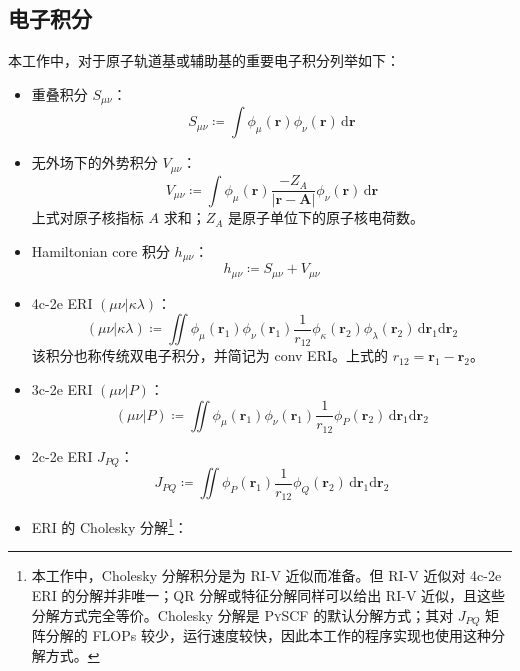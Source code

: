 \subsection{电子积分}

本工作中，对于原子轨道基或辅助基的重要电子积分列举如下：
\begin{itemize}[nosep]
\item 重叠积分 $S_{\mu \nu}$：
\begin{equation}
    S_{\mu \nu} \coloneq \int \phi_\mu (\bm{r}) \phi_\nu (\bm{r}) \, \mathrm{d} \bm{r}
\end{equation}
\item 无外场下的外势积分 $V_{\mu \nu}$：
\begin{equation}
    V_{\mu \nu} \coloneq \int \phi_\mu (\bm{r}) \frac{- Z_A}{|\bm{r} - \bm{A}|} \phi_\nu (\bm{r}) \, \mathrm{d} \bm{r}
\end{equation}
上式对原子核指标 $A$ 求和；$Z_A$ 是原子单位下的原子核电荷数。
\item Hamiltonian core 积分 $h_{\mu \nu}$：
\begin{equation}
    h_{\mu \nu} \coloneq S_{\mu \nu} + V_{\mu \nu}
\end{equation}
\item 4c-2e ERI $(\mu \nu | \kappa \lambda)$：
\begin{equation}
    (\mu \nu | \kappa \lambda) \coloneq \iint \phi_\mu (\bm{r}_1) \phi_\nu (\bm{r}_1) \frac{1}{r_{12}} \phi_\kappa (\bm{r}_2) \phi_\lambda (\bm{r}_2) \, \mathrm{d} \bm{r}_1 \mathrm{d} \bm{r}_2
\end{equation}
该积分也称传统双电子积分，并简记为 conv ERI。上式的 $r_{12} = \bm{r}_1 - \bm{r}_2$。
\item 3c-2e ERI $(\mu \nu | P)$：
\begin{equation}
    (\mu \nu | P) \coloneq \iint \phi_\mu (\bm{r}_1) \phi_\nu (\bm{r}_1) \frac{1}{r_{12}} \phi_P (\bm{r}_2) \, \mathrm{d} \bm{r}_1 \mathrm{d} \bm{r}_2
\end{equation}
\item 2c-2e ERI $J_{PQ}$：
\begin{equation}
    J_{PQ} \coloneq \iint \phi_P (\bm{r}_1) \frac{1}{r_{12}} \phi_Q (\bm{r}_2) \, \mathrm{d} \bm{r}_1 \mathrm{d} \bm{r}_2
\end{equation}
\item ERI 的 Cholesky 分解\footnote{本工作中，Cholesky 分解积分是为 RI-V 近似而准备。但 RI-V 近似对 4c-2e ERI 的分解并非唯一；QR 分解或特征分解同样可以给出 RI-V 近似，且这些分解方式完全等价。Cholesky 分解是 \textsc{PySCF} 的默认分解方式；其对 $J_{PQ}$ 矩阵分解的 FLOPs 较少，运行速度较快，因此本工作的程序实现也使用这种分解方式。}：

\end{itemize}

